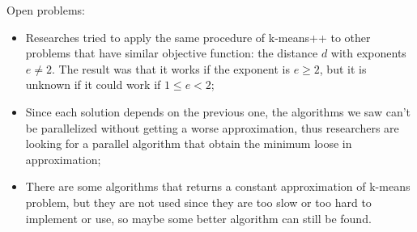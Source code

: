 Open problems:
\begin{itemize}
    \item Researches tried to apply the same procedure of k-means++ to other problems that have similar objective function: the distance $d$ with exponents $e \neq 2$. The result was that it works if the exponent is $e \geq 2$, but it is unknown if it could work if $1 \leq e < 2$;
    \item Since each solution depends on the previous one, the algorithms we saw can't be parallelized without getting a worse approximation, thus researchers are looking for a parallel algorithm that obtain the minimum loose in approximation;
    \item There are some algorithms that returns a constant approximation of k-means problem, but they are not used since they are too slow or too hard to implement or use, so maybe some better algorithm can still be found.
\end{itemize}
